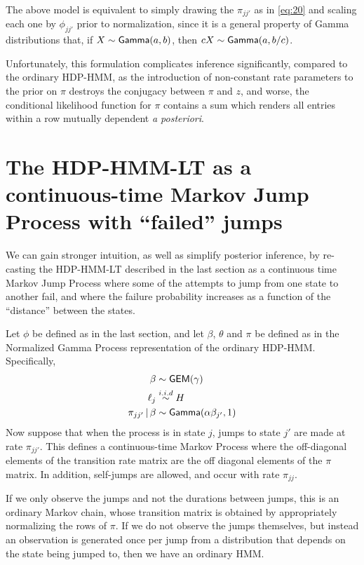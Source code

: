 The above model is equivalent to simply drawing the $\pi_{jj'}$ as in
\eqref{eq:20} and scaling each one by $\phi_{jj'}$ prior to
normalization, since it is a general property of Gamma distributions
that, if $X \sim \mathsf{Gamma}(a,b)$, then $cX \sim \mathsf{Gamma}(a,b/c)$.

Unfortunately, this formulation complicates inference significantly,
compared to the ordinary HDP-HMM, as the introduction of non-constant 
rate parameters to the prior on
$\pi$ destroys the conjugacy between $\pi$ and $z$, and worse, the
conditional likelihood function for $\pi$ contains a sum
which renders all entries within a row mutually dependent {\em a posteriori}.

\section{The HDP-HMM-LT as a continuous-time 
Markov Jump Process with ``failed'' jumps}
\label{sec:dist-based-filt}

We can gain stronger intuition, as well as simplify posterior
inference, by re-casting the HDP-HMM-LT described in the last section
as a continuous time Markov Jump Process where some of the attempts to jump
from one state to another fail, and where the failure probability
increases as a function of the ``distance'' between the states.

Let $\phi$ be defined as in the last section, and let 
$\beta$, $\theta$ and $\pi$ be defined as in the Normalized Gamma
Process representation of the ordinary HDP-HMM.  Specifically,
\begin{align}
  \label{eq:beta} \beta &\sim \mathsf{GEM}(\gamma) \\
  \ell_j &\stackrel{i.i.d}{\sim} H \\
  \pi_{jj'} \, \vert \, \beta &\sim \mathsf{Gamma}(\alpha \beta_{j'},1)
\end{align}
Now suppose that when the process is in state $j$, jumps to state
$j'$ are made at rate $\pi_{jj'}$.  This defines a continuous-time
Markov Process where the off-diagonal elements of the transition rate
matrix are the off diagonal elements of the $\pi$ matrix.  In addition,
self-jumps are allowed, and occur with rate $\pi_{jj}$.   

If we only observe the jumps and not the durations between jumps, this is an
ordinary Markov chain, whose transition matrix is obtained by
appropriately normalizing the rows of $\pi$.  
If we do not observe the jumps themselves, but
instead an observation is generated once per jump from a distribution that depends
on the state being jumped to, then we have an ordinary HMM.

